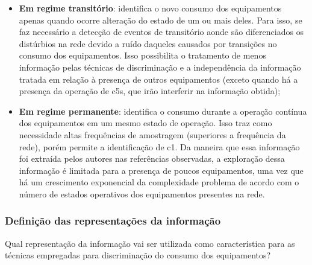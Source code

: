 \begin{itemize}
\item \textbf{Em regime transitório}: identifica o novo consumo dos
equipamentos apenas quando ocorre alteração do estado de um ou mais
deles. Para isso, se faz necessário a detecção de eventos de
transitório aonde são diferenciados os distúrbios na rede devido a
ruído daqueles causados por transições no consumo dos equipamentos.
Isso possibilita o tratamento de menos informação pelas técnicas de
discriminação e a independência da informação tratada em relação à
presença de outros equipamentos (exceto quando há a presença da
operação de \glspl{c5}, que irão interferir na informação obtida); 
\item \textbf{Em regime permanente}: identifica o consumo durante a
operação contínua dos equipamentos em um mesmo estado de operação.
Isso traz como necessidade altas frequências de amostragem (superiores
a frequência da rede), porém permite a identificação de \acs{c1}.
Da maneira que essa informação foi extraída pelos autores nas
referências observadas, a exploração dessa informação é limitada para
a presença de poucos equipamentos, uma vez que há um crescimento
exponencial da complexidade problema de acordo com o número de
estados operativos dos equipamentos presentes na rede.
\end{itemize}

\subsubsection{Definição das representações da informação}
\label{top:caracteristicas}

Qual representação da informação vai ser utilizada como característica
para as técnicas empregadas para discriminação do consumo dos
equipamentos?

